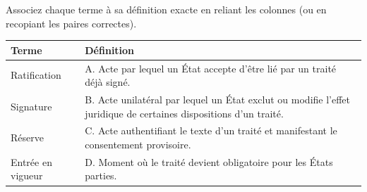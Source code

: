 \documentclass[11pt]{article}
\begin{document}
\begin{exercice}
Associez chaque terme à sa définition exacte en reliant les colonnes (ou en recopiant les paires correctes).

\begin{tabular}{|p{4cm}|p{4cm}|}
\hline
\textbf{Terme} & \textbf{Définition} \\
\hline
Ratification & A. Acte par lequel un État accepte d'être lié par un traité déjà signé. \\
Signature & B. Acte unilatéral par lequel un État exclut ou modifie l'effet juridique de certaines dispositions d'un traité. \\
Réserve & C. Acte authentifiant le texte d'un traité et manifestant le consentement provisoire. \\
Entrée en vigueur & D. Moment où le traité devient obligatoire pour les États parties. \\
\hline
\end{tabular}
\end{exercice}
\end{document}
